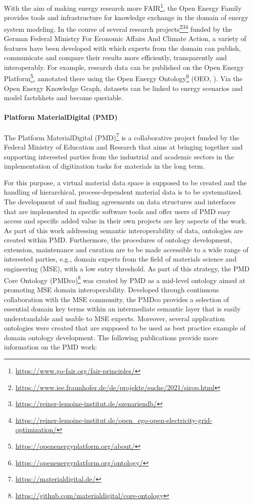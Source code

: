 With the aim of making energy research more FAIR\footnote{\url{https://www.go-fair.org/fair-principles/}}, the Open Energy Family provides tools and infrastructure for knowledge exchange in the domain of energy system modeling. In the course of several research projects\footnote{\url{https://www.iee.fraunhofer.de/de/projekte/suche/2021/sirop.html}}\footnote{\url{https://reiner-lemoine-institut.de/szenariendb/}}\footnote{\url{https://reiner-lemoine-institut.de/open_ego-open-electricity-grid-optimization/}} funded by the German Federal Ministry For Economic Affairs And Climate Action, a variety of features have been developed with which experts from the domain can publish, communicate and compare their results more efficiently, transparently and interoperably. For example, research data can be published on the Open Energy Platform\footnote{\url{https://openenergyplatform.org/about/}}, annotated there using the Open Energy Ontology\footnote{\url{https://openenergyplatform.org/ontology/}} (OEO, \cite{oeo2021}). Via the Open Energy Knowledge Graph, datasets can be linked to energy scenarios and model factshhets and become queriable.

\paragraph{Platform MaterialDigital (PMD)}

The Platform MaterialDigital (PMD)\footnote{\url{https://materialdigital.de/}} is a collaborative project funded by the Federal Ministry of Education and Research that aims at bringing together and supporting interested parties from the industrial and academic sectors in the implementation of digitization tasks for materials in the long term.

For this purpose, a virtual material data space is supposed to be created and the handling of hierarchical, process-dependent material data is to be systematized. The development of and finding agreements on data structures and interfaces that are implemented in specific software tools and offer users of PMD easy access and specific added value in their own projects are key aspects of the work. As part of this work addressing semantic interoperability of data, ontologies are created within PMD. Furthermore, the procedures of ontology development, extension, maintenance and curation are to be made accessible to a wide range of interested parties, e.g., domain experts from the field of materials science and engineering (MSE), with a low entry threshold. 
As part of this strategy, the PMD Core Ontology (PMDco)\footnote{\url{https://github.com/materialdigital/core-ontology}} was created by PMD as a mid-level ontology aimed at promoting MSE domain interoperability. Developed through continuous collaboration with the MSE community, the PMDco provides a selection of essential domain key terms within an intermediate semantic layer that is easily understandable and usable to MSE experts. Moreover, several application ontologies were created that are supposed to be used as best practice example of domain ontology development. The following publications provide more information on the PMD work: 


